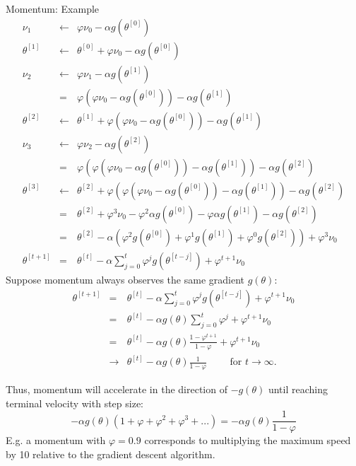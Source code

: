 \documentclass[11pt,compress,t,notes=noshow, xcolor=table]{beamer}
\begin{document}
\begin{vbframe}{Momentum: Example}
  \footnotesize 
  \begin{eqnarray*}
    \nu_{1} &\leftarrow& \varphi \nu_0 - \alpha g(\theta^{[0]}) \\[0.1cm]
    \theta^{[1]} &\leftarrow& \theta^{[0]} + \varphi \nu_0 - \alpha g(\theta^{[0]}) \\[0.1cm]
    \nu_{2} &\leftarrow& \varphi \nu_1 - \alpha g(\theta^{[1]}) \\
            &=& \varphi (\varphi \nu_0 - \alpha g(\theta^{[0]})) - \alpha g(\theta^{[1]}) \\[0.1cm]
    \theta^{[2]} &\leftarrow& \theta^{[1]} + \varphi (\varphi \nu_0 - \alpha g(\theta^{[0]})) - \alpha g(\theta^{[1]}) \\[0.1cm]
    \nu_{3} &\leftarrow& \varphi \nu_2 - \alpha g(\theta^{[2]}) \\
            &=& \varphi (\varphi (\varphi \nu_0 - \alpha g(\theta^{[0]})) - \alpha g(\theta^{[1]})) - \alpha g(\theta^{[2]}) \\[0.1cm]
    \theta^{[3]} &\leftarrow& \theta^{[2]} + \varphi (\varphi (\varphi \nu_0 - \alpha g(\theta^{[0]})) - \alpha g(\theta^{[1]})) - \alpha g(\theta^{[2]}) \\
            &=& \theta^{[2]} + \varphi^3\nu_0 - \varphi^2\alpha g(\theta^{[0]}) - \varphi \alpha g(\theta^{[1]}) - \alpha g(\theta^{[2]}) \\
            &=& \theta^{[2]} - \alpha(\varphi^2g(\theta^{[0]}) + \varphi^1g(\theta^{[1]}) + \varphi^0g(\theta^{[2]})) + \varphi^3 \nu_0 \\
\theta^{[t+1]} &=& \theta^{[t]} - \alpha \displaystyle\sum_{j = 0}^{t} \varphi^j g(\theta^{[t - j]}) + \varphi^{t+1}\nu_0
  \end{eqnarray*}
Suppose momentum always observes the same gradient $g(\theta)$:
  \footnotesize 
  \begin{eqnarray*}
    \theta^{[t+1]} &=& \theta^{[t]} - \alpha \displaystyle\sum_{j = 0}^{t} \varphi^j g(\theta^{[t-j]}) + \varphi^{t+1}\nu_0 \\
                 &=& \theta^{[t]} - \alpha g(\theta) \displaystyle\sum_{j = 0}^{t} \varphi^j + \varphi^{t+1}\nu_0 \\
                 &=& \theta^{[t]} - \alpha g(\theta) \frac{1 - \varphi^{t+1}}{1 - \varphi} + \varphi^{t+1} \nu_0 \\
                 &\to& \theta^{[t]} - \alpha g(\theta) \frac{1}{1 - \varphi} \qquad \text{ for } t \to \infty. 
  \end{eqnarray*}

Thus, momentum will accelerate in the direction of $-g(\theta)$ until reaching terminal velocity with step size: 
    $$-\alpha g(\theta)(1 + \varphi + \varphi^2 + \varphi^3 + ...) = -\alpha g(\theta) \frac{1}{1 - \varphi}$$
E.g. a momentum with $\varphi = 0.9$ corresponds to multiplying the maximum speed by 10 relative to the gradient descent algorithm. 
\end{vbframe}
\end{document}
